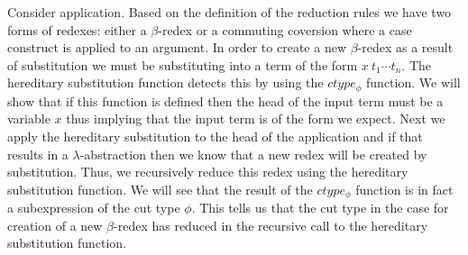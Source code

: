 Consider application.  Based on the definition of the reduction rules
we have two forms of redexes: either a $\beta$-redex or a commuting
coversion where a case construct is applied to an argument.  In order
to create a new $\beta$-redex as a result of substitution we must be
substituting into a term of the form $x\ t_1 \cdots t_n$.  The
hereditary substitution function detects this by using the
$ctype_\phi$ function.  We will show that if this function is defined
then the head of the input term must be a variable $x$ thus implying
that the input term is of the form we expect.  Next we apply the
hereditary substitution to the head of the application and if that
results in a $\lambda$-abstraction then we know that a new redex will
be created by substitution.  Thus, we recursively reduce this redex
using the hereditary substitution function.  We will see that the
result of the $ctype_\phi$ function is in fact a subexpression of the
cut type $\phi$.  This tells us that the cut type in the case for
creation of a new $\beta$-redex has reduced in the recursive call to
the hereditary substitution function.


